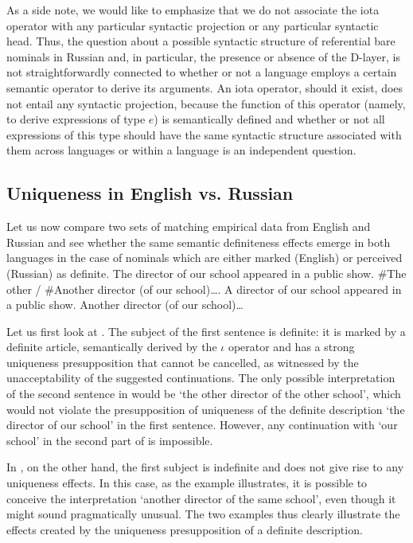 \documentclass[output=paper,
colorlinks,
citecolor=brown,
newtxmath
]{langscibook}
\begin{document}
As a side note, we would like to emphasize that we do not associate the iota operator with any particular syntactic projection or any particular syntactic head. Thus, the question about a possible syntactic structure of referential bare nominals in Russian and, in particular, the presence or absence of the D-layer, is not straightforwardly connected to whether or not a language employs a certain semantic operator to derive its arguments. An iota operator, should it exist, does not entail any syntactic projection, because the function of this operator (namely, to derive expressions of type $e$) is semantically defined and whether or not all expressions of this type should have the same syntactic structure associated with them across languages or within a language is an independent question.



\subsection{Uniqueness in English vs. Russian}
Let us now compare two sets of matching empirical data from English and Russian and see whether the same semantic definiteness effects emerge in both languages in the case of nominals which are either marked (English) or perceived (Russian) as definite.
\ea \label{ex:22}
The director of our school appeared in a public show. \#The other / \#Another director (of our school)….
\z
\ea \label{ex:23}
A director of our school appeared in a public show. Another director (of our school)…
\z

\noindent
Let us first look at . The subject of the first sentence is definite: it is marked by a definite article, semantically derived by the ${\iota}$ operator and has a strong uniqueness presupposition that cannot be cancelled, as witnessed by the unacceptability of the suggested continuations. The only possible interpretation of the second sentence in  would be `the other director of the other school', which would not violate the presupposition of uniqueness of the definite description `the director of our school' in the first sentence. However, any continuation with `our school' in the second part of  is impossible.

In , on the other hand, the first subject is indefinite and does not give rise to any uniqueness effects. In this case, as the example illustrates, it is possible to conceive the interpretation `another director of the same school', even though it might sound pragmatically unusual. The two examples thus clearly illustrate the effects created by the uniqueness presupposition of a definite description.
\end{document}
